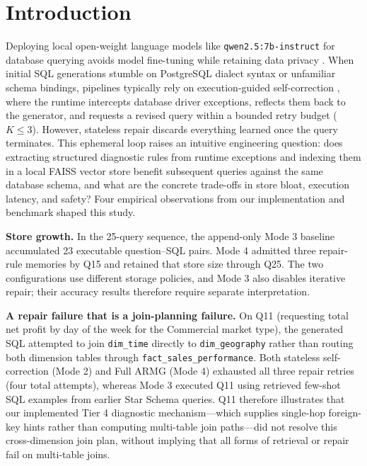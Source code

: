 \section{Introduction}
Deploying local open-weight language models like \texttt{qwen2.5:\allowbreak{}7b-\allowbreak{}instruct} \cite{qwen2024qwen25} for database querying avoids model fine-tuning while retaining data privacy \cite{pourreza2023dinsql, gao2024dailsql}. When initial SQL generations stumble on PostgreSQL dialect syntax or unfamiliar schema bindings, pipelines typically rely on execution-guided self-correction \cite{madaan2023selfrefine, chen2024selfdebug}, where the runtime intercepts database driver exceptions, reflects them back to the generator, and requests a revised query within a bounded retry budget ($K \le 3$). However, stateless repair discards everything learned once the query terminates. This ephemeral loop raises an intuitive engineering question: does extracting structured diagnostic rules from runtime exceptions and indexing them in a local FAISS vector store \cite{johnson2021faiss} benefit subsequent queries against the same database schema, and what are the concrete trade-offs in store bloat, execution latency, and safety? Four empirical observations from our implementation and benchmark shaped this study.

\textbf{Store growth.} In the 25-query sequence, the append-only Mode 3 baseline accumulated 23 executable question--SQL pairs. Mode 4 admitted three repair-rule memories by Q15 and retained that store size through Q25. The two configurations use different storage policies, and Mode 3 also disables iterative repair; their accuracy results therefore require separate interpretation.

\textbf{A repair failure that is a join-planning failure.} On Q11 (requesting total net profit by day of the week for the Commercial market type), the generated SQL attempted to join \texttt{dim\_time} directly to \texttt{dim\_geography} rather than routing both dimension tables through \texttt{fact\_sales\_performance}. Both stateless self-correction (Mode 2) and Full ARMG (Mode 4) exhausted all three repair retries (four total attempts), whereas Mode 3 executed Q11 using retrieved few-shot SQL examples from earlier Star Schema queries. Q11 therefore illustrates that our implemented Tier 4 diagnostic mechanism---which supplies single-hop foreign-key hints rather than computing multi-table join paths---did not resolve this cross-dimension join plan, without implying that all forms of retrieval or repair fail on multi-table joins.

